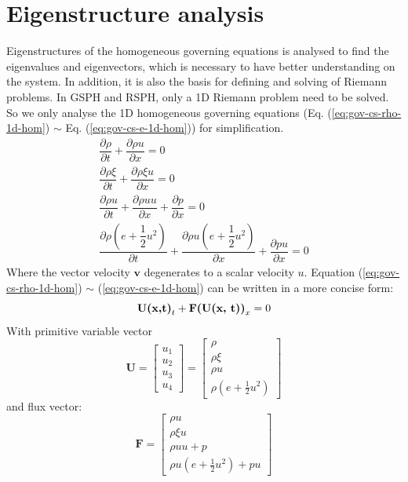 \section{Eigenstructure analysis}

Eigenstructures of the homogeneous governing equations is analysed to find the eigenvalues and eigenvectors, which is necessary to have better understanding on the system. In addition, it is also the basis for defining and solving of Riemann problems. In GSPH and RSPH, only a 1D Riemann problem need to be solved. So we only analyse the 1D homogeneous governing equations (Eq. (\ref{eq:gov-cs-rho-1d-hom}) $\sim$ Eq. (\ref{eq:gov-cs-e-1d-hom})) for simplification.
\begin{align}
\dfrac{\partial \rho}{\partial t} + \dfrac{\partial \rho u} {\partial x}= 0 \label{eq:gov-cs-rho-1d-hom} \\
\dfrac{\partial \rho \xi}{\partial t} + \dfrac{\partial \rho \xi u} {\partial x}= 0 \label{eq:gov-cs-ks-1d-hom}\\
\dfrac{\partial \rho u}{\partial t} + \dfrac{\partial \rho u u} {\partial x} + \dfrac{\partial p} {\partial x}= 0 \label{eq:gov-cs-v-1d-hom} \\
\dfrac{\partial \rho (e+\dfrac{1}{2}u^2)}{\partial t} + \dfrac{\partial \rho u (e+\dfrac{1}{2}u^2) } {\partial x} + \dfrac{\partial pu} {\partial x} = 0 \label{eq:gov-cs-e-1d-hom}
\end{align}
Where the vector velocity $\textbf{v}$ degenerates to a scalar velocity $u$. Equation (\ref{eq:gov-cs-rho-1d-hom}) $\sim$ (\ref{eq:gov-cs-e-1d-hom}) can be written in a more concise form:
\begin{equation}
\textbf{U(x,t)}_t + \textbf{F(\textbf{U}(x, t))}_x = 0
\end{equation}
With primitive variable vector
\begin{equation}
   \textbf{U}=\begin{bmatrix}
         u_1 \\
         u_2 \\
         u_3 \\
         u_4
     \end{bmatrix}
    =\begin{bmatrix}
         \rho \\
         \rho\xi \\
         \rho u   \\
         \rho(e+\frac{1}{2}u^2)
     \end{bmatrix}
\end{equation}
and flux vector: 
\begin{equation}
   \textbf{F}=\begin{bmatrix}
         \rho u \\
         \rho\xi u \\
         \rho u  u + p  \\
         \rho u(e+\frac{1}{2}u^2) + pu
     \end{bmatrix}
\end{equation}

